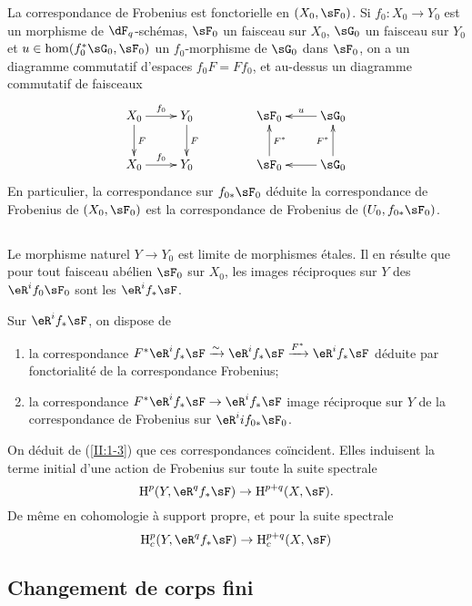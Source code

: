 La correspondance de Frobenius est fonctorielle en $(X_0,\sF_0)$. Si 
$f_0:X_0\to Y_0$ est un morphisme de $\dF_q$-schémas, $\sF_0$ un faisceau sur 
$X_0$, $\sG_0$ un faisceau sur $Y_0$ et $u\in\hom(f_0^*\sG_0,\sF_0)$ un 
$f_0$-morphisme de $\sG_0$ dans $\sF_0$, on a un diagramme commutatif d'espaces 
$f_0 F = F f_0$, et au-dessus un diagramme commutatif de faisceaux 
\[\xymatrix{
  X_0 \ar[r]^-{f_0} \ar[d]^-F
    & Y_0 \ar[d]^-F \\
  X_0 \ar[r]^-{f_0} 
    & Y_0
}\qquad\qquad
\xymatrix{
  \sF_0 
    & \ar[l]_-u \sG_0 \\
  \sF_0 \ar[u]_-{F^*} 
    & \ar[l] \sG_0 \ar[u]^-{F^*}
}\]
En particulier, la correspondance sur $f_{0*}\sF_0$ déduite la correspondance 
de Frobenius de $(X_0,\sF_0)$ est la correspondance de Frobenius de 
$(U_0,f_{0*}\sF_0)$. 





\subsection{}\label{II:1-4}

Le morphisme naturel $Y\to Y_0$ est limite de morphismes étales. Il en 
résulte que pour tout faisceau abélien $\sF_0$ sur $X_0$, les images 
réciproques sur $Y$ des $\eR^if_0\sF_0$ sont les $\eR^if_*\sF$. 

Sur $\eR^if_*\sF$, on dispose de 
\begin{enumerate}[\indent a)]
  \item la correspondance 
    $F^*\eR^i f_*\sF \iso \eR^i f_*\sF \xrightarrow{F^*} \eR^if_*\sF$ déduite 
    par fonctorialité de la correspondance Frobenius; 
  \item la correspondance $F^*\eR^if_*\sF\to\eR^if_*\sF$ image réciproque sur 
    $Y$ de la correspondance de Frobenius sur $\eR^ii f_{0*}\sF_0$. 
\end{enumerate}

On déduit de (\ref{II:1-3}) que ces correspondances coïncident. Elles 
induisent la terme initial d'une action de Frobenius sur toute la suite 
spectrale 
\[
  \h^p(Y,\eR^q f_*\sF) \rightarrow \h^{p+q}(X,\sF) \text{.}
\]
De même en cohomologie à support propre, et pour la suite spectrale 
\[
  \h_c^p(Y,\eR^q f_* \sF) \rightarrow \h_c^{p+q}(X,\sF)
\]





\subsection{Changement de corps fini}\label{II:1-5}

